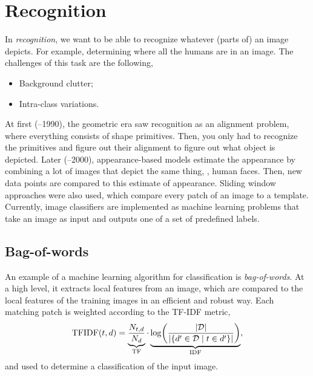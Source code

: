 \section{Recognition} \label{sec:recognition}

In \textit{recognition}, we want to be able to recognize whatever (parts of) an
image depicts. For example, determining where all the humans are in an image. The
challenges of this task are the following,
\begin{itemize}
    \item Background clutter;
    \item Intra-class variations.
\end{itemize}

At first (--1990), the geometric era saw recognition as an
alignment problem, where everything consists of shape primitives. Then, you
only had to recognize the primitives and figure out their alignment to figure
out what object is depicted. Later (--2000), appearance-based
models estimate the appearance by combining a lot of images that depict the
same thing, \eg, human faces. Then, new data points are compared to this
estimate of appearance. Sliding window approaches were also used, which compare
every patch of an image to a template. Currently, image classifiers are
implemented as machine learning problems that take an image as input and
outputs one of a set of predefined labels.

\subsection{Bag-of-words}

An example of a machine learning algorithm for classification is
\textit{bag-of-words}. At a high level, it extracts local features from an
image, which are compared to the local features of the training images in an
efficient and robust way. Each matching patch is weighted according to the
TF-IDF metric, \[
    \mathrm{TFIDF}(t,d) = \underbrace{\frac{N_{t,d}}{N_d}}_{\mathrm{TF}} \cdot \underbrace{\log\lft( \frac{|\mathcal{D}|}{|\{ d'\in\mathcal{D} \mid t \in d' \}|} \rgt)}_{\mathrm{IDF}},
\]
and used to determine a classification of the input image.

